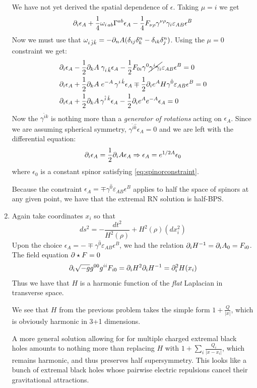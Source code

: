 \documentclass[11pt, class=article, crop=false]{standalone}
\begin{document}
\begin{enumerate}
	We have not yet derived the spatial dependence of $\epsilon$. Taking $\mu = i$ we get
	\[
		\partial_i \epsilon_A + \frac14 \omega_{i \, ab} \Gamma^{ab} \epsilon_A - \frac14 F_{\nu \rho} \gamma^{\nu \rho} \gamma_i \varepsilon_{AB} \epsilon^B
	\]
	Now we must use that $\omega_{i\, \hat j \hat k} = - \partial_n A (\delta_{ij} \delta^n_k - \delta_{ik} \delta^n_j)$. Using the $\mu=0$ constraint we get:
	\[
		\begin{aligned}
			&\partial_i \epsilon_A - \frac12 \partial_k A \;  \gamma_{i\, \hat k} \epsilon_A - \frac12 F_{0i} \gamma^{0} \cancel{\gamma^i \gamma_i} \varepsilon_{AB} \epsilon^B = 0\\
			&  \partial_i \epsilon_A + \frac12 \partial_k A\;  e^{-A}\,  \gamma^{i\, \hat k} \epsilon_A \mp  \frac12 \partial_i e^{A} H \gamma^{\hat 0} \varepsilon_{AB} \epsilon^B = 0\\
			&\partial_i \epsilon_A + \frac12 \partial_k A \,  \gamma^{\hat i\, \hat k} \epsilon_A - \frac12 \partial_i e^{A} e^{-A} \epsilon_A = 0
		\end{aligned}
	\]
	Now the $\gamma^{\hat i \hat k}$ is nothing more than a \emph{generator of rotations} acting on $\epsilon_A$. Since we are assuming spherical symmetry, $\gamma^{\hat i \hat k} \epsilon_A = 0$ and we are left with the differential equation:
	\[
		\partial_i \epsilon_A = \frac12 \partial_i A  \epsilon_A \Rightarrow \epsilon_A = e^{1/2 A} \epsilon_0
	\]
	where $\epsilon_0$ is a constant spinor satisfying \eqref{eq:spinorconstraint}.
	
	Because the constraint $\epsilon_A = \mp \gamma^{\hat 0} \varepsilon_{AB} \epsilon^B$ applies to half the space of spinors at any given point, we have that the extremal RN solution is half-BPS. 
	
	\item 
	Again take coordinates $x_i$ so that
	\[
		ds^2 = -\frac{dt^2}{H^2(\rho)} + H^2(\rho) (dx_i^2)
	\]
	 Upon the choice $\epsilon_A = -\mp \gamma^{\hat 0} \varepsilon_{AB}  \epsilon^B$, we had the relation $\partial_i H^{-1} = \partial_i A_0 = F_{i0}$. The field equation $\partial \star F = 0$
	 \[
	 	\partial_i \sqrt{-g} g^{00} g^{ii} F_{i0} = \partial_i H^2 \partial_i H^{-1} = \partial_i^2 H(x_i)
	 \]
	 Thus we have that $H$ is a harmonic function of the \emph{flat} Laplacian in transverse space. 
	
	We see that $H$ from the previous problem takes the simple form $1+ \frac{Q}{|x|}$, which is obviously harmonic in 3+1 dimensions.
	
	A more general solution allowing for for multiple charged extremal black holes amounts to nothing more than replacing $H$ with $1 + \sum_i \frac{Q_i}{|x - x_i|}$, which remains harmonic, and thus preserves half supersymmetry. This looks like a bunch of extremal black holes whose pairwise electric repulsions cancel their gravitational attractions.
	

\end{enumerate}
\end{document}
